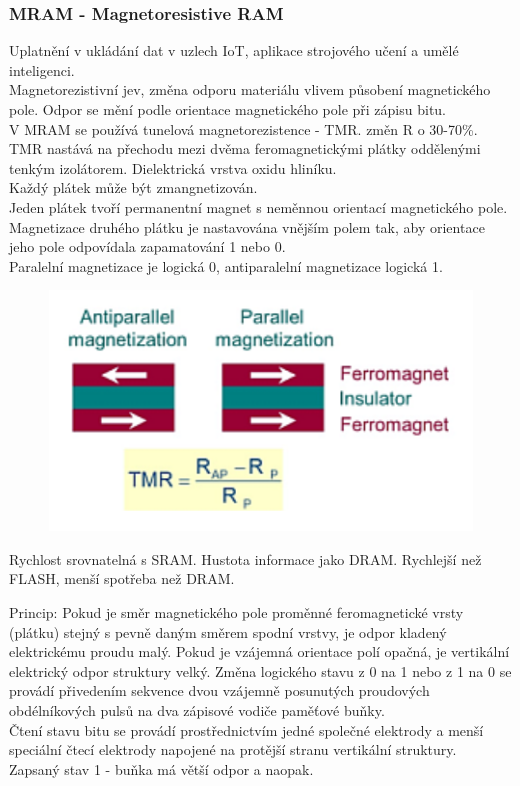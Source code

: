 \subsubsection*{MRAM - Magnetoresistive RAM}
Uplatnění v ukládání dat v uzlech IoT, aplikace strojového učení a umělé inteligenci.\\
Magnetorezistivní jev, změna odporu materiálu vlivem působení magnetického pole. Odpor se mění podle orientace magnetického pole při zápisu bitu.\\
V MRAM se používá tunelová magnetorezistence - TMR. změn R o 30-70\%.\\
TMR nastává na přechodu mezi dvěma feromagnetickými plátky oddělenými tenkým izolátorem. Dielektrická vrstva oxidu hliníku.\\
Každý plátek může být zmangnetizován. \\
Jeden plátek tvoří permanentní magnet s neměnnou orientací magnetického pole.\\
Magnetizace druhého plátku je nastavována vnějším polem tak, aby orientace jeho pole odpovídala zapamatování 1 nebo 0.\\
Paralelní magnetizace je logická 0, antiparalelní magnetizace logická 1.

\begin{figure}[h!]
    \centering
    \includegraphics[scale = 0.5]{img/MRAM.png}
\end{figure}

Rychlost srovnatelná s SRAM. Hustota informace jako DRAM. Rychlejší než FLASH, menší spotřeba než DRAM.

Princip: Pokud je směr magnetického pole proměnné feromagnetické vrsty (plátku) stejný s pevně daným směrem spodní vrstvy, je odpor kladený elektrickému proudu malý. Pokud je vzájemná orientace polí opačná, je vertikální elektrický odpor struktury velký. Změna logického stavu z 0 na 1 nebo z 1 na 0 se provádí přivedením sekvence dvou vzájemně posunutých proudových obdélníkových pulsů na dva zápisové vodiče paměťové buňky.\\
Čtení stavu bitu se provádí prostřednictvím jedné společné elektrody a menší speciální čtecí elektrody napojené na protější stranu vertikální struktury.\\
Zapsaný stav 1 - buňka má větší odpor a naopak.\\

